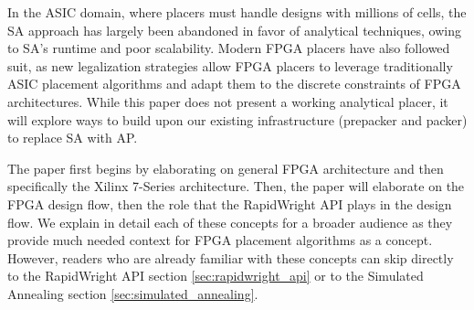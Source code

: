 In the ASIC domain, where placers must handle designs with millions of cells, the SA approach has largely been abandoned in favor of analytical techniques, owing to SA's runtime and poor scalability. 
Modern FPGA placers have also followed suit, as new legalization strategies allow FPGA placers to leverage traditionally ASIC placement algorithms and adapt them to the discrete constraints of FPGA architectures. 
While this paper does not present a working analytical placer, it will explore ways to build upon our existing infrastructure (prepacker and packer) to replace SA with AP. 

The paper first begins by elaborating on general FPGA architecture and then specifically the Xilinx 7-Series architecture. 
Then, the paper will elaborate on the FPGA design flow, then the role that the RapidWright API plays in the design flow. 
We explain in detail each of these concepts for a broader audience as they provide much needed context for FPGA placement algorithms as a concept. 
However, readers who are already familiar with these concepts can skip directly to the RapidWright API section \ref{sec:rapidwright_api} or to the Simulated Annealing section \ref{sec:simulated_annealing}. 
